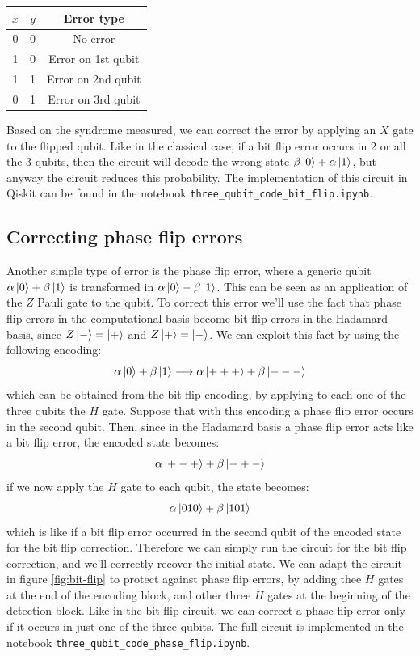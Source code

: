 \documentclass{article}
\begin{document}
	\begin{table}[H]
		\centering
		\begin{tabular}{|c|c|c|}
			\hline
			$x$ & $y$ & Error type \\
			\hline
			\hline
			0 & 0 & No error \\
			\hline
			1 & 0 & Error on 1st qubit\\
			\hline
			1 & 1 & Error on 2nd qubit \\
			\hline
			0 & 1 & Error on 3rd qubit \\
			\hline
		\end{tabular}
	\end{table}
	\noindent Based on the syndrome measured, we can correct the error by applying an $X$ gate to the flipped qubit. Like in the classical case, if a bit flip error occurs in 2 or all the 3 qubits, then the circuit will decode the wrong state $\beta\ket{0} + \alpha\ket{1}$, but anyway the circuit reduces this probability. The implementation of this circuit in Qiskit can be found in the notebook \verb|three_qubit_code_bit_flip.ipynb|.
	 

	\subsection{Correcting phase flip errors}
	Another simple type of error is the phase flip error, where a generic qubit $\alpha \ket{0} + \beta\ket{1}$ is transformed in $\alpha\ket{0} - \beta\ket{1}$. This can be seen as an application of the $Z$ Pauli gate to the qubit. To correct this error we'll use the fact that phase flip errors in the computational basis become bit flip errors in the Hadamard basis, since $Z\ket{-} = \ket{+}$ and $Z\ket{+} = \ket{-}$. We can exploit this fact by using the following encoding:
	\[ \alpha\ket{0} + \beta\ket{1} \longrightarrow \alpha\ket{+++} + \beta\ket{---}\]
	which can be obtained from the bit flip encoding, by applying to each one of the three qubits the $H$ gate. Suppose that with this encoding a phase flip error occurs in the second qubit. Then, since in the Hadamard basis a phase flip error acts like a bit flip error, the encoded state becomes:
	\[ \alpha\ket{+-+} + \beta\ket{-+-} \]
	if we now apply the $H$ gate to each qubit, the state becomes:
	\[ \alpha\ket{010} + \beta\ket{101} \]
	which is like if a bit flip error occurred in the second qubit of the encoded state for the bit flip correction. Therefore we can simply run the circuit for the bit flip correction, and we'll correctly recover the initial state. We can adapt the circuit in figure \ref{fig:bit-flip} to protect against phase flip errors, by adding thee $H$ gates at the end of the encoding block, and other three $H$ gates at the beginning of the detection block. Like in the bit flip circuit, we can correct a phase flip error only if it occurs in just one of the three qubits. The full circuit is implemented in the notebook \verb|three_qubit_code_phase_flip.ipynb|.
	
\end{document}
